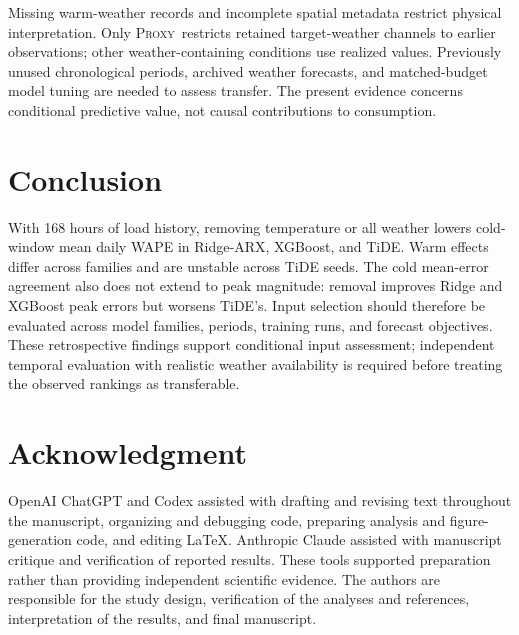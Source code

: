 \documentclass[conference]{IEEEtran}
\newcommand{\proxy}{\textsc{Proxy}}
\begin{document}
Missing warm-weather records and incomplete spatial metadata restrict physical interpretation. Only \proxy\ restricts retained target-weather channels to earlier observations; other weather-containing conditions use realized values. Previously unused chronological periods, archived weather forecasts, and matched-budget model tuning are needed to assess transfer. The present evidence concerns conditional predictive value, not causal contributions to consumption.

\section{Conclusion}
With 168 hours of load history, removing temperature or all weather lowers cold-window mean daily WAPE in Ridge-ARX, XGBoost, and TiDE. Warm effects differ across families and are unstable across TiDE seeds. The cold mean-error agreement also does not extend to peak magnitude: removal improves Ridge and XGBoost peak errors but worsens TiDE's. Input selection should therefore be evaluated across model families, periods, training runs, and forecast objectives. These retrospective findings support conditional input assessment; independent temporal evaluation with realistic weather availability is required before treating the observed rankings as transferable.

\section*{Acknowledgment}
OpenAI ChatGPT and Codex assisted with drafting and revising text throughout the manuscript, organizing and debugging code, preparing analysis and figure-generation code, and editing LaTeX. Anthropic Claude assisted with manuscript critique and verification of reported results. These tools supported preparation rather than providing independent scientific evidence. The authors are responsible for the study design, verification of the analyses and references, interpretation of the results, and final manuscript.

\balance


\end{document}
